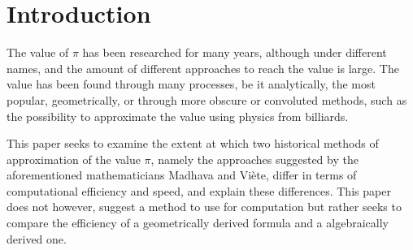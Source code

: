 \section{Introduction}


The value of $\pi$ has been researched for many years, although under different names,
and the amount of different approaches to reach the value is large. The value has been 
found through many processes, be it analytically, the most popular, geometrically, or through 
more obscure or convoluted methods, such as the possibility to approximate the value using 
physics from billiards. \cite{galperin_2003}

This paper seeks to examine the extent at which two historical methods of
approximation of the value $\pi$, namely the approaches suggested by the aforementioned 
mathematicians Madhava and Viète, differ in terms of computational efficiency and 
speed, and explain these differences. This paper does not however, 
suggest a method to use for computation but rather seeks to compare the efficiency of
a geometrically derived formula and a algebraically derived one. 